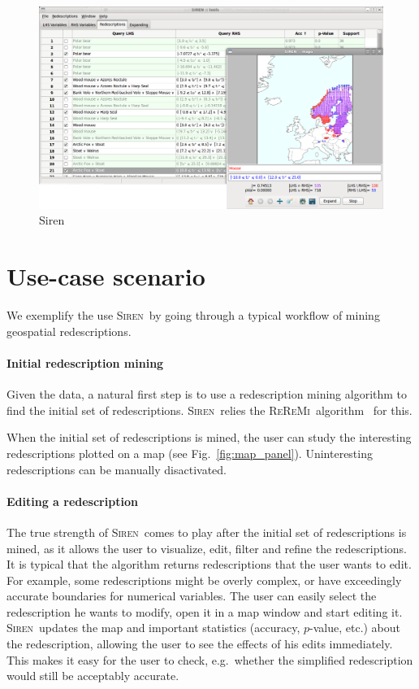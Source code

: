 \documentclass{sig-alternate}
\newcommand{\prg}[1]{\paragraph{#1}}
\newcommand{\Siren}{\textsc{Siren}}
\newcommand{\ReReMi}{\textsc{ReReMi}}
\begin{document}
\begin{figure}[t]
  \centering
\includegraphics[width=\textwidth]{screenshots/both_panels_02.png}
  \caption{Siren}
  \label{fig:both_panels}
\end{figure}


\section{Use-case scenario}
\label{sec:scenarios}
We exemplify the use \Siren\ by going through a typical workflow
of mining geospatial redescriptions.

\prg{Initial redescription mining}
Given the data, a natural first step is to use a redescription mining
algorithm to find the initial set of redescriptions. \Siren\ relies the
\ReReMi\ algorithm~\cite{galbrun11black} for this. 

When the initial set of redescriptions is mined, the user can study the
interesting redescriptions plotted on a map (see
Fig.~\ref{fig:map_panel}).
Uninteresting redescriptions can be manually disactivated.

 
\prg{Editing a redescription} 
The true strength of \Siren\ comes to play after the initial set of
redescriptions is mined, as it allows the user to visualize, edit,
filter and refine the redescriptions.  It is typical that the
algorithm returns redescriptions that the user wants to edit. For
example, some redescriptions might be overly complex, or have
exceedingly accurate boundaries for numerical variables. The user can
easily select the redescription he wants to modify, open it in a map
window and start editing it. \Siren\ updates the map and important
statistics (accuracy, $p$-value, etc.) about the redescription,
allowing the user to see the effects of his edits immediately. This
makes it easy for the user to check, e.g.\ whether the simplified
redescription would still be acceptably accurate.
\end{document}
